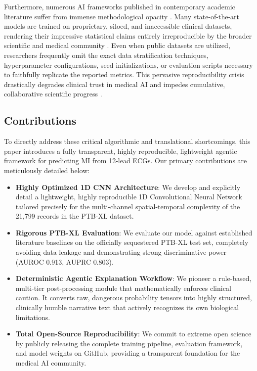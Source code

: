 \documentclass[10pt,twocolumn,letterpaper]{article}
\begin{document}
Furthermore, numerous AI frameworks published in contemporary academic literature suffer from immense methodological opacity \cite{ioannidis2005why}. Many state-of-the-art models are trained on proprietary, siloed, and inaccessible clinical datasets, rendering their impressive statistical claims entirely irreproducible by the broader scientific and medical community \cite{biondi2020reproducibility}. Even when public datasets are utilized, researchers frequently omit the exact data stratification techniques, hyperparameter configurations, seed initializations, or evaluation scripts necessary to faithfully replicate the reported metrics. This pervasive reproducibility crisis drastically degrades clinical trust in medical AI and impedes cumulative, collaborative scientific progress \cite{miotto2018deep}.

\subsection{Contributions}
To directly address these critical algorithmic and translational shortcomings, this paper introduces a fully transparent, highly reproducible, lightweight agentic framework for predicting MI from 12-lead ECGs. Our primary contributions are meticulously detailed below:

\begin{itemize}
    \item \textbf{Highly Optimized 1D CNN Architecture}: We develop and explicitly detail a lightweight, highly reproducible 1D Convolutional Neural Network tailored precisely for the multi-channel spatial-temporal complexity of the 21,799 records in the PTB-XL dataset.
    \item \textbf{Rigorous PTB-XL Evaluation}: We evaluate our model against established literature baselines on the officially sequestered PTB-XL test set, completely avoiding data leakage and demonstrating strong discriminative power (AUROC 0.913, AUPRC 0.803).
    \item \textbf{Deterministic Agentic Explanation Workflow}: We pioneer a rule-based, multi-tier post-processing module that mathematically enforces clinical caution. It converts raw, dangerous probability tensors into highly structured, clinically humble narrative text that actively recognizes its own biological limitations.
    \item \textbf{Total Open-Source Reproducibility}: We commit to extreme open science by publicly releasing the complete training pipeline, evaluation framework, and model weights on GitHub, providing a transparent foundation for the medical AI community.
\end{itemize}
\end{document}

